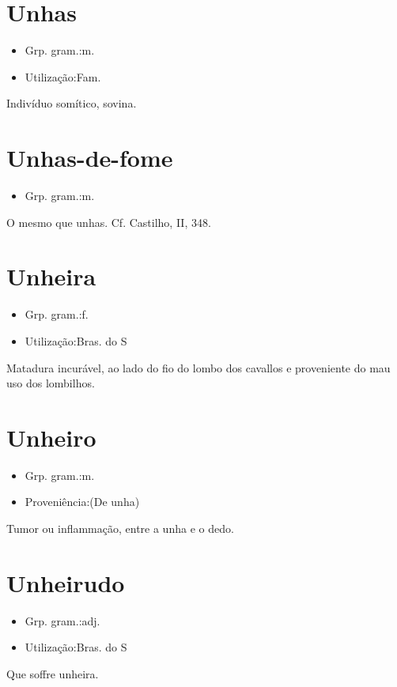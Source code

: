\documentclass{article}
\begin{document}
\section{Unhas}
\begin{itemize}
\item {Grp. gram.:m.}
\end{itemize}
\begin{itemize}
\item {Utilização:Fam.}
\end{itemize}
Indivíduo somítico, sovina.
\section{Unhas-de-fome}
\begin{itemize}
\item {Grp. gram.:m.}
\end{itemize}
O mesmo que \textunderscore unhas\textunderscore . Cf. Castilho, II, 348.
\section{Unheira}
\begin{itemize}
\item {Grp. gram.:f.}
\end{itemize}
\begin{itemize}
\item {Utilização:Bras. do S}
\end{itemize}
Matadura incurável, ao lado do fio do lombo dos cavallos e proveniente do mau uso dos lombilhos.
\section{Unheiro}
\begin{itemize}
\item {Grp. gram.:m.}
\end{itemize}
\begin{itemize}
\item {Proveniência:(De \textunderscore unha\textunderscore )}
\end{itemize}
Tumor ou inflammação, entre a unha e o dedo.
\section{Unheirudo}
\begin{itemize}
\item {Grp. gram.:adj.}
\end{itemize}
\begin{itemize}
\item {Utilização:Bras. do S}
\end{itemize}
Que soffre unheira.
\end{document}
